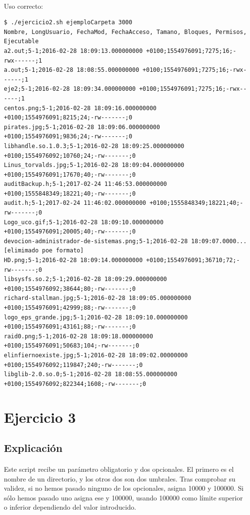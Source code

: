\documentclass[12pt,a4paper]{article}
\begin{document}
\paragraph{}
Uso correcto:
\begin{lstlisting}[basicstyle=\ttfamily\scriptsize]
$ ./ejercicio2.sh ejemploCarpeta 3000
Nombre, LongUsuario, FechaMod, FechaAcceso, Tamano, Bloques, Permisos, Ejecutable
a2.out;5-1;2016-02-28 18:09:13.000000000 +0100;1554976091;7275;16;-rwx------;1
a.out;5-1;2016-02-28 18:08:55.000000000 +0100;1554976091;7275;16;-rwx------;1
eje2;5-1;2016-02-28 18:09:34.000000000 +0100;1554976091;7275;16;-rwx------;1
centos.png;5-1;2016-02-28 18:09:16.000000000 +0100;1554976091;8215;24;-rw-------;0
pirates.jpg;5-1;2016-02-28 18:09:06.000000000 +0100;1554976091;9836;24;-rw-------;0
libhandle.so.1.0.3;5-1;2016-02-28 18:09:25.000000000 +0100;1554976092;10760;24;-rw-------;0
Linus_torvalds.jpg;5-1;2016-02-28 18:09:04.000000000 +0100;1554976091;17670;40;-rw-------;0
auditBackup.h;5-1;2017-02-24 11:46:53.000000000 +0100;1555848349;18221;40;-rw-------;0
audit.h;5-1;2017-02-24 11:46:02.000000000 +0100;1555848349;18221;40;-rw-------;0
Logo_uco.gif;5-1;2016-02-28 18:09:10.000000000 +0100;1554976091;20005;40;-rw-------;0
devocion-administrador-de-sistemas.png;5-1;2016-02-28 18:09:07.0000...[elimimado poe formato]
HD.png;5-1;2016-02-28 18:09:14.000000000 +0100;1554976091;36710;72;-rw-------;0
libsysfs.so.2;5-1;2016-02-28 18:09:29.000000000 +0100;1554976092;38644;80;-rw-------;0
richard-stallman.jpg;5-1;2016-02-28 18:09:05.000000000 +0100;1554976091;42999;88;-rw-------;0
logo_eps_grande.jpg;5-1;2016-02-28 18:09:10.000000000 +0100;1554976091;43161;88;-rw-------;0
raid0.png;5-1;2016-02-28 18:09:18.000000000 +0100;1554976091;50683;104;-rw-------;0
elinfiernoexiste.jpg;5-1;2016-02-28 18:09:02.00000000 +0100;1554976092;119847;240;-rw-------;0
libglib-2.0.so.0;5-1;2016-02-28 18:08:55.000000000 +0100;1554976092;822344;1608;-rw-------;0
\end{lstlisting}
  
\pagebreak

\section{Ejercicio 3}
\subsection{Explicación}
\paragraph{}
Este script recibe un parámetro obligatorio y dos opcionales. El primero es el nombre de un directorio, y los otros dos son dos umbrales. Tras comprobar su validez, si no hemos pasado ninguno de los opcionales, asigna  10000 y 100000. Si sólo hemos pasado uno asigna ese y 100000, usando 100000 como límite superior o inferior dependiendo del valor introducido.
\end{document}

